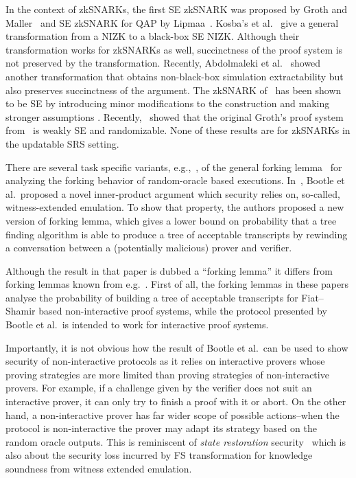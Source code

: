 In the context of zkSNARKs, the first
SE zkSNARK was proposed by Groth and Maller~\cite{C:GroMal17} and SE
zkSNARK for QAP by Lipmaa~\cite{EPRINT:Lipmaa19a}. 
Kosba's et
al.~\cite{EPRINT:KZMQCP15} give a general transformation from a NIZK to a
black-box SE NIZK. Although their transformation works for zkSNARKs as well,
succinctness of the proof system is not preserved by the transformation.
Recently, Abdolmaleki et al.~\cite{CCS:AbdRamSla20} showed another transformation that
obtains non-black-box simulation extractability but also preserves
succinctness of the argument. 
The zkSNARK of~\cite{EC:Groth16} has been shown to be SE by introducing minor modifications to the construction and making
stronger assumptions \cite{EPRINT:BowGab18,EPRINT:AtaBag19}. Recently,~\cite{EPRINT:BKSV20} showed that the
original Groth's proof system from~\cite{EC:Groth16} is weakly SE and
randomizable. None of these results are for zkSNARKs in the updatable SRS setting.

There are several task specific variants, e.g.,~\cite{INDOCRYPT:HerSae03,CCS:BagCheJar08,AC:BelDaiLi19}, of the general forking lemma~\cite{JC:PoiSte00,CCS:BelNev06} for analyzing the forking behavior of random-oracle based executions.
In~\cite{EC:BCCGP16}, Bootle et al.~proposed a novel inner-product argument which
security relies on, so-called, witness-extended emulation. To show that
property, the authors proposed a new version of forking lemma, which gives a
lower bound on probability that a tree finding algorithm is able to produce a 
tree of acceptable transcripts by rewinding a conversation between a
(potentially malicious) prover and verifier.

Although the result in that paper is dubbed a ``forking lemma'' it
differs from forking lemmas known from e.g.~\cite{JC:PoiSte00,CCS:BelNev06}.
First of all, the forking lemmas in these papers analyse the probability of building
a tree of acceptable transcripts for Fiat--Shamir based non-interactive proof
systems, while the protocol presented by Bootle et al.~is intended to work for
interactive proof systems.

Importantly, it is not obvious how the result of Bootle et al.~can be used to
show security of non-interactive protocols as it relies on interactive provers
whose proving strategies are more limited than proving strategies of
non-interactive provers. For example, if a challenge given by the verifier does not
suit an interactive prover, it can only try to finish a proof with it or
abort. On the other hand, a non-interactive prover has far wider scope of
possible actions--when the protocol is non-interactive the prover may
adapt its strategy based on the random oracle outputs. 
This is reminiscent of \emph{state restoration} security~\cite{TCC:BenChiSpo16,EPRINT:Holmgren19} which is also about the security loss incurred by FS transformation for knowledge soundness from witness extended emulation.

